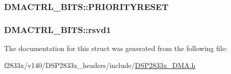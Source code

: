 \subsubsection[{P\+R\+I\+O\+R\+I\+T\+Y\+R\+E\+S\+E\+T}]{ D\+M\+A\+C\+T\+R\+L\+\_\+\+B\+I\+T\+S\+::\+P\+R\+I\+O\+R\+I\+T\+Y\+R\+E\+S\+E\+T}\label{struct_d_m_a_c_t_r_l___b_i_t_s_a797c9c9861146e7939354143c47cd215}
\hypertarget{struct_d_m_a_c_t_r_l___b_i_t_s_aa60ac0792a323bcdc65def49a829d9a7}{}
\subsubsection[{rsvd1}]{ D\+M\+A\+C\+T\+R\+L\+\_\+\+B\+I\+T\+S\+::rsvd1}\label{struct_d_m_a_c_t_r_l___b_i_t_s_aa60ac0792a323bcdc65def49a829d9a7}


The documentation for this struct was generated from the following file\+:\begin{DoxyCompactItemize}
\item 
f2833x/v140/\+D\+S\+P2833x\+\_\+headers/include/\hyperlink{_d_s_p2833x___d_m_a_8h}{D\+S\+P2833x\+\_\+\+D\+M\+A.\+h}\end{DoxyCompactItemize}
